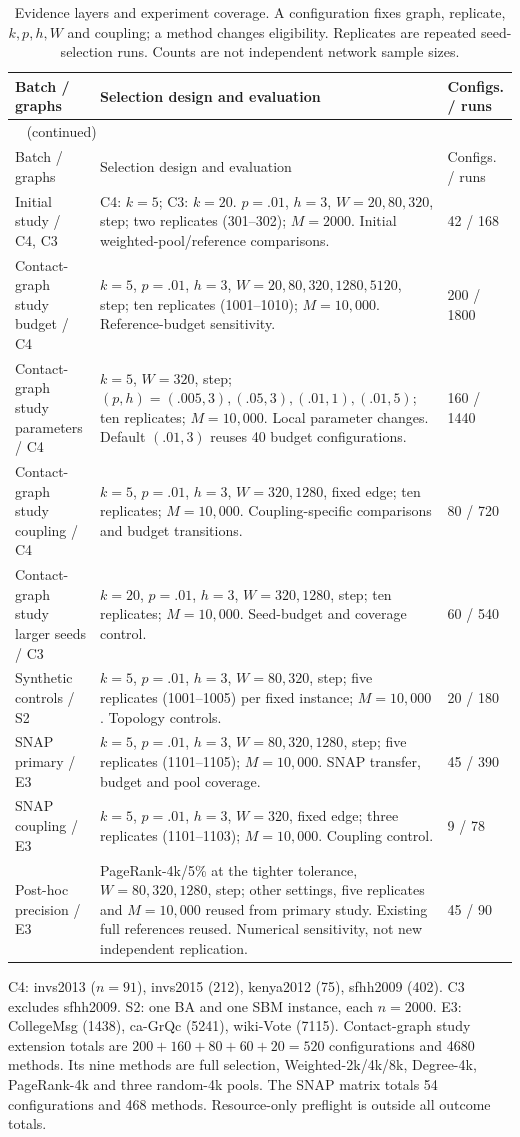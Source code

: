 \begin{longtable}{p{.23\linewidth}p{.51\linewidth}p{.14\linewidth}}
\caption{Evidence layers and experiment coverage. A configuration fixes graph, replicate, $k,p,h,W$ and coupling; a method changes eligibility. Replicates are repeated seed-selection runs. Counts are not independent network sample sizes.}\label{tab:hist-coverage}\\
\toprule Batch / graphs & Selection design and evaluation & Configs. / runs\\\midrule\endfirsthead
\multicolumn{3}{l}{\tablename~\thetable{} (continued)}\\\toprule
Batch / graphs & Selection design and evaluation & Configs. / runs\\\midrule\endhead\bottomrule\endfoot
Initial study / C4, C3 & C4: $k=5$; C3: $k=20$. $p=.01$, $h=3$, $W=20,80,320$, step; two replicates (301--302); $M=2000$. Initial weighted-pool/reference comparisons. & 42 / 168\\
Contact-graph study budget / C4 & $k=5$, $p=.01$, $h=3$, $W=20,80,320,1280,5120$, step; ten replicates (1001--1010); $M=10{,}000$. Reference-budget sensitivity. & 200 / 1800\\
Contact-graph study parameters / C4 & $k=5$, $W=320$, step; $(p,h)=(.005,3),(.05,3),(.01,1),(.01,5)$; ten replicates; $M=10{,}000$. Local parameter changes. Default $(.01,3)$ reuses 40 budget configurations. & 160 / 1440\\
Contact-graph study coupling / C4 & $k=5$, $p=.01$, $h=3$, $W=320,1280$, fixed edge; ten replicates; $M=10{,}000$. Coupling-specific comparisons and budget transitions. & 80 / 720\\
Contact-graph study larger seeds / C3 & $k=20$, $p=.01$, $h=3$, $W=320,1280$, step; ten replicates; $M=10{,}000$. Seed-budget and coverage control. & 60 / 540\\
Synthetic controls / S2 & $k=5$, $p=.01$, $h=3$, $W=80,320$, step; five replicates (1001--1005) per fixed instance; $M=10{,}000$. Topology controls. & 20 / 180\\
SNAP primary / E3 & $k=5$, $p=.01$, $h=3$, $W=80,320,1280$, step; five replicates (1101--1105); $M=10{,}000$. SNAP transfer, budget and pool coverage. & 45 / 390\\
SNAP coupling / E3 & $k=5$, $p=.01$, $h=3$, $W=320$, fixed edge; three replicates (1101--1103); $M=10{,}000$. Coupling control. & 9 / 78\\
Post-hoc precision / E3 & PageRank-4k/5\% at the tighter tolerance, $W=80,320,1280$, step; other settings, five replicates and $M=10{,}000$ reused from primary study. Existing full references reused. Numerical sensitivity, not new independent replication. & 45 / 90\\
\end{longtable}
\noindent C4: invs2013 ($n=91$), invs2015 (212), kenya2012 (75), sfhh2009 (402).
C3 excludes sfhh2009. S2: one BA and one SBM instance, each $n=2000$.
E3: CollegeMsg (1438), ca-GrQc (5241), wiki-Vote (7115).
Contact-graph study extension totals are $200+160+80+60+20=520$ configurations and 4680 methods.
Its nine methods are full selection, Weighted-2k/4k/8k, Degree-4k, PageRank-4k and three random-4k pools.
The SNAP matrix totals 54 configurations and 468 methods. Resource-only preflight is outside all outcome totals.

